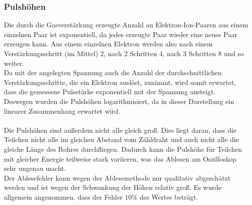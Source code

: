 \documentclass[12pt,a4paper]{article}
\begin{document}
\subsubsection{Pulshöhen}

Die durch die Gasverstärkung erzeugte Anzahl an Elektron-Ion-Paaren aus einem einzelnen Paar ist exponentiell, da jedes erzeugte Paar wieder eine neues Paar erzeugen kann. Aus einem einzelnen Elektron werden also nach einem Verstärkungsschritt (im Mittel) 2, nach 2 Schritten 4, nach 3 Schritten 8 und so weiter.\\
Da mit der angelegten Spannung auch die Anzahl der durchschnittlichen Verstärkungsschritte, die ein Elektron auslöst, zunimmt, wird somit erwartet, dass die gemessene Pulsstärke exponentiell mit der Spannung ansteigt.\\
Deswegen wurden die Pulshöhen logarithmisiert, da in dieser Darstellung ein linearer Zusammenhang erwartet wird.\\
\\
Die Pulshöhen sind außerdem nicht alle gleich groß. Dies liegt daran, dass die Teilchen nicht alle im gleichen Abstand vom Zähldraht und auch nicht alle die gleiche Länge des Rohres durchfliegen. Dadurch kann die Pulshöhe für Teilchen mit gleicher Energie teilweise stark variieren, was das Ablesen am Oszilloskop sehr ungenau macht.\\
Der Ablesefehler kann wegen der Ablesemethode nur qualitativ abgeschätzt werden und ist wegen der Schwankung der Höhen relativ groß. Es wurde allgemein angenommen, dass der Fehler $10\%$ des Wertes beträgt.
\end{document}
